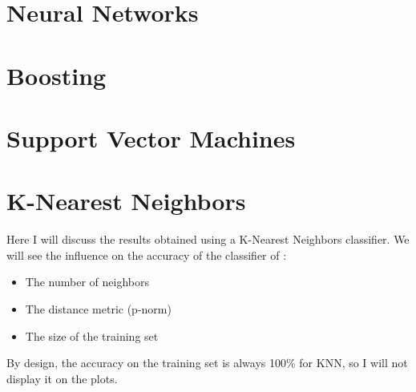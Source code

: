 \documentclass[twocolumn, a4paper, 10pt]{article}
\begin{document}
	\section{Neural Networks}
	\section{Boosting}
	\section{Support Vector Machines}
	\section{K-Nearest Neighbors}
		Here I will discuss the results obtained using a K-Nearest Neighbors classifier. We will see the influence on the accuracy of the classifier of :
		\begin{itemize}
			\item The number of neighbors
			\item The distance metric (p-norm)
			\item The size of the training set
		\end{itemize}
		By design, the accuracy on the training set is always 100\% for KNN, so I will not display it on the plots.
\end{document}
